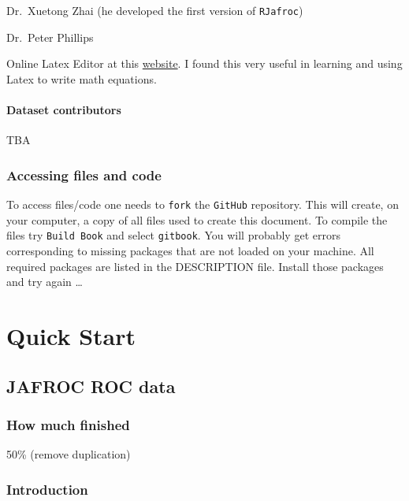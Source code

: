 \documentclass[
]{book}
\begin{document}
Dr.~Xuetong Zhai (he developed the first version of \texttt{RJafroc})

Dr.~Peter Phillips

Online Latex Editor at this \href{https://latexeditor.lagrida.com/}{website}. I found this very useful in learning and using Latex to write math equations.

\hypertarget{quick-start-index-dataset-contributors}{%
\subsection{Dataset contributors}\label{quick-start-index-dataset-contributors}}

TBA

\hypertarget{quick-start-index-how-to-access-files}{%
\section{Accessing files and code}\label{quick-start-index-how-to-access-files}}

To access files/code one needs to \texttt{fork} the \texttt{GitHub} repository. This will create, on your computer, a copy of all files used to create this document. To compile the files try \texttt{Build\ Book} and select \texttt{gitbook}. You will probably get errors corresponding to missing packages that are not loaded on your machine. All required packages are listed in the DESCRIPTION file. Install those packages and try again \ldots{}

\hypertarget{part-quick-start}{%
\part*{Quick Start}\label{part-quick-start}}

\hypertarget{quick-start-roc}{%
\chapter{JAFROC ROC data}\label{quick-start-roc}}

\hypertarget{quick-start-roc-how-much-finished}{%
\section{How much finished}\label{quick-start-roc-how-much-finished}}

50\% (remove duplication)

\hypertarget{quick-start-roc-intro}{%
\section{Introduction}\label{quick-start-roc-intro}}
\end{document}
